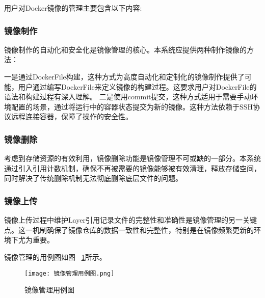 用户对Docker镜像的管理主要包含以下内容:

\subsubsection{镜像制作}
镜像制作的自动化和安全化是镜像管理的核心。本系统应提供两种制作镜像的方法：

一是通过DockerFile构建，这种方式为高度自动化和定制化的镜像制作提供了可能，用户通过编写DockerFile来定义镜像的构建过程。这要求用户对DockerFile的语法和构建过程有深入理解。
二是使用commit提交，这种方式适用于需要手动环境配置的场景，通过将运行中的容器状态提交为新的镜像。这种方法依赖于SSH协议远程连接容器，保障了操作的安全性。

\subsubsection{镜像删除}
考虑到存储资源的有效利用，镜像删除功能是镜像管理不可或缺的一部分。本系统通过引入引用计数机制，确保不再被需要的镜像能够被有效清理，释放存储空间，同时解决了传统删除机制无法彻底删除底层文件的问题。

\subsubsection{镜像上传}
镜像上传过程中维护Layer引用记录文件的完整性和准确性是镜像管理的另一关键点。这一机制确保了镜像仓库的数据一致性和完整性，特别是在镜像频繁更新的环境下尤为重要。

镜像管理的用例图如图~ \ref{fig:镜像管理用例图}所示。

\begin{figure}[h]
  \centering
  \texttt{[image: 镜像管理用例图.png]}
  \caption{镜像管理用例图}
  \label{fig:镜像管理用例图}
\end{figure}


